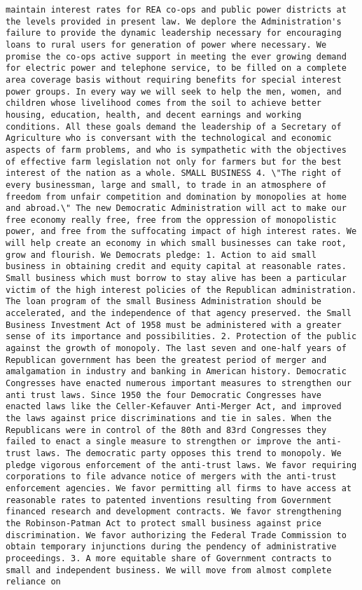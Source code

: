 \documentclass[
]{article}
\begin{document}
\begin{verbatim}
maintain interest rates for REA co-ops and public power districts at the levels provided in present law. We deplore the Administration's failure to provide the dynamic leadership necessary for encouraging loans to rural users for generation of power where necessary. We promise the co-ops active support in meeting the ever growing demand for electric power and telephone service, to be filled on a complete area coverage basis without requiring benefits for special interest power groups. In every way we will seek to help the men, women, and children whose livelihood comes from the soil to achieve better housing, education, health, and decent earnings and working conditions. All these goals demand the leadership of a Secretary of Agriculture who is conversant with the technological and economic aspects of farm problems, and who is sympathetic with the objectives of effective farm legislation not only for farmers but for the best interest of the nation as a whole. SMALL BUSINESS 4. \"The right of every businessman, large and small, to trade in an atmosphere of freedom from unfair competition and domination by monopolies at home and abroad.\" The new Democratic Administration will act to make our free economy really free, free from the oppression of monopolistic power, and free from the suffocating impact of high interest rates. We will help create an economy in which small businesses can take root, grow and flourish. We Democrats pledge: 1. Action to aid small business in obtaining credit and equity capital at reasonable rates. Small business which must borrow to stay alive has been a particular victim of the high interest policies of the Republican administration. The loan program of the small Business Administration should be accelerated, and the independence of that agency preserved. the Small Business Investment Act of 1958 must be administered with a greater sense of its importance and possibilities. 2. Protection of the public against the growth of monopoly. The last seven and one-half years of Republican government has been the greatest period of merger and amalgamation in industry and banking in American history. Democratic Congresses have enacted numerous important measures to strengthen our anti trust laws. Since 1950 the four Democratic Congresses have enacted laws like the Celler-Kefauver Anti-Merger Act, and improved the laws against price discriminations and tie in sales. When the Republicans were in control of the 80th and 83rd Congresses they failed to enact a single measure to strengthen or improve the anti-trust laws. The democratic party opposes this trend to monopoly. We pledge vigorous enforcement of the anti-trust laws. We favor requiring corporations to file advance notice of mergers with the anti-trust enforcement agencies. We favor permitting all firms to have access at reasonable rates to patented inventions resulting from Government financed research and development contracts. We favor strengthening the Robinson-Patman Act to protect small business against price discrimination. We favor authorizing the Federal Trade Commission to obtain temporary injunctions during the pendency of administrative proceedings. 3. A more equitable share of Government contracts to small and independent business. We will move from almost complete reliance on 
\end{verbatim}
\end{document}
